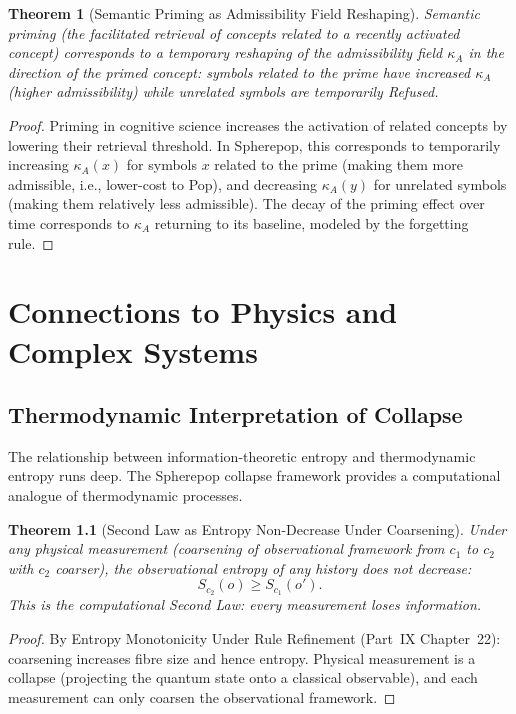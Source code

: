 \documentclass[12pt, a4paper, openany]{book}
\theoremstyle{plain}
\newtheorem{theorem}{Theorem}[chapter]
\theoremstyle{definition}
\theoremstyle{remark}
\begin{document}
\begin{theorem}[Semantic Priming as Admissibility Field Reshaping]
Semantic priming (the facilitated retrieval of concepts related to a recently
activated concept) corresponds to a temporary reshaping of the admissibility
field $\kappa_A$ in the direction of the primed concept: symbols related to
the prime have increased $\kappa_A$ (higher admissibility) while unrelated
symbols are temporarily Refused.
\end{theorem}

\begin{proof}
Priming in cognitive science increases the activation of related concepts by
lowering their retrieval threshold. In Spherepop, this corresponds to
temporarily increasing $\kappa_A(x)$ for symbols $x$ related to the prime
(making them more admissible, i.e., lower-cost to Pop), and decreasing
$\kappa_A(y)$ for unrelated symbols (making them relatively less admissible).
The decay of the priming effect over time corresponds to $\kappa_A$ returning
to its baseline, modeled by the forgetting rule.
\end{proof}

\chapter{Connections to Physics and Complex Systems}

\section{Thermodynamic Interpretation of Collapse}

The relationship between information-theoretic entropy and thermodynamic entropy
runs deep. The Spherepop collapse framework provides a computational analogue
of thermodynamic processes.

\begin{theorem}[Second Law as Entropy Non-Decrease Under Coarsening]
Under any physical measurement (coarsening of observational framework from
$c_1$ to $c_2$ with $c_2$ coarser), the observational entropy of any history
does not decrease:
\[
S_{c_2}(o) \geq S_{c_1}(o').
\]
This is the computational Second Law: every measurement loses information.
\end{theorem}

\begin{proof}
By Entropy Monotonicity Under Rule Refinement (Part~IX Chapter~22): coarsening
increases fibre size and hence entropy. Physical measurement is a collapse
(projecting the quantum state onto a classical observable), and each measurement
can only coarsen the observational framework.
\end{proof}
\end{document}
